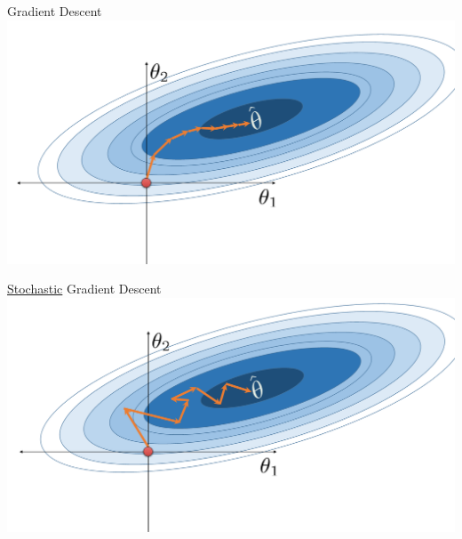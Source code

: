 \documentclass[aspectratio=169]{../latex_main/tntbeamer}  %
\begin{document}
	
	\begin{frame}{Gradient Descent}
	    \vspace{-.5cm}
	    \includegraphics[scale=.4]{Bild30}
	\end{frame}
	
	
	
	\begin{frame}{\underline{Stochastic} Gradient Descent}
	    \vspace{-.5cm}
        \includegraphics[scale=.4]{Bild31}
	\end{frame}
\end{document}
